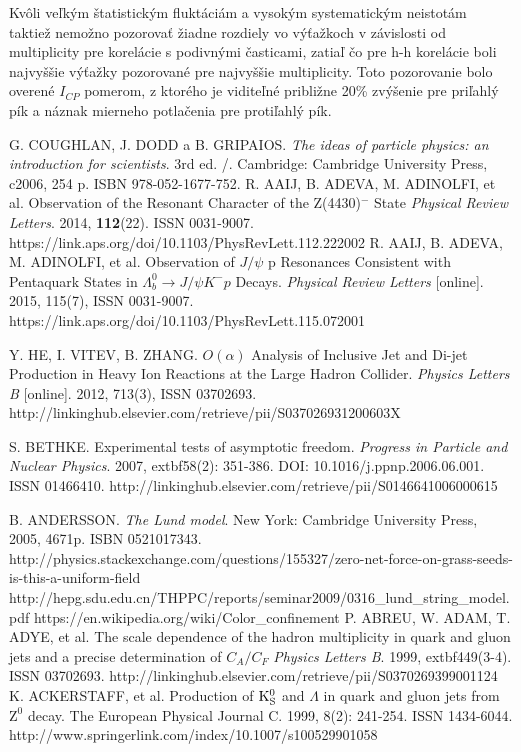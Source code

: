 \documentclass[thesismargins, thesislinespacing]{rnthesis}
\begin{document}
Kvôli veľkým štatistickým fluktáciám a vysokým systematickým neistotám taktiež nemožno pozorovať žiadne rozdiely vo výťažkoch v závislosti od multiplicity pre korelácie s podivnými časticami, zatiaľ čo pre h-h korelácie boli najvyššie výťažky pozorované pre najvyššie multiplicity. Toto pozorovanie bolo overené $I_{CP}$ pomerom, z ktorého je viditeľné približne 20\% zvýšenie pre priľahlý pík a náznak mierneho potlačenia pre protiľahlý pík.  




%


\begin{thebibliography}{}

G. COUGHLAN, J. DODD a B. GRIPAIOS. \textit{The ideas of particle physics: an introduction for scientists}. 3rd ed. /. Cambridge: Cambridge University Press, c2006, 254 p. ISBN 978-052-1677-752.
R. AAIJ, B. ADEVA, M. ADINOLFI, et al. Observation of the Resonant Character of the Z(4430)$^{-}$ State \textit{Physical Review Letters}. 2014, \textbf{112}(22). ISSN 0031-9007. https://link.aps.org/doi/10.1103/PhysRevLett.112.222002
R. AAIJ, B. ADEVA, M. ADINOLFI, et al. Observation of $J / \psi$ p Resonances Consistent with Pentaquark States in $\Lambda_b^0 \rightarrow J / \psi K^{-}p$ Decays. \textit{Physical Review Letters} [online]. 2015, 115(7),  ISSN 0031-9007. https://link.aps.org/doi/10.1103/PhysRevLett.115.072001

Y. HE, I. VITEV, B. ZHANG. 
 $O(\alpha)$ Analysis of Inclusive Jet and Di-jet Production in Heavy Ion Reactions at the Large Hadron Collider. \textit{Physics Letters B} [online]. 2012, 713(3), ISSN 03702693. http://linkinghub.elsevier.com/retrieve/pii/S037026931200603X

S. BETHKE. Experimental tests of asymptotic freedom. \textit{Progress in Particle and Nuclear Physics}. 2007, extbf{58}(2): 351-386. DOI: 10.1016/j.ppnp.2006.06.001. ISSN 01466410.  http://linkinghub.elsevier.com/retrieve/pii/S0146641006000615

B. ANDERSSON. \textit{The Lund model}. New York: Cambridge University Press, 2005, 4671p. ISBN 0521017343.
http://physics.stackexchange.com/questions/155327/zero-net-force-on-grass-seeds-is-this-a-uniform-field
http://hepg.sdu.edu.cn/THPPC/reports/seminar2009/0316\_lund\_string\_model.pdf
https://en.wikipedia.org/wiki/Color\_confinement
P. ABREU, W. ADAM, T. ADYE, et al. The scale dependence of the hadron multiplicity in quark and gluon jets and a precise determination of $C_A/C_F$ \textit{Physics Letters B}. 1999, extbf{449}(3-4). ISSN 03702693.  http://linkinghub.elsevier.com/retrieve/pii/S0370269399001124
K. ACKERSTAFF, et al.  Production of ${\rm K}^0_{\rm S}$ and $\Lambda$ in quark and gluon jets from $\mathrm{Z^0}$ decay. The European Physical Journal C. 1999, 8(2): 241-254. ISSN 1434-6044.
http://www.springerlink.com/index/10.1007/s100529901058


\end{thebibliography}
\end{document}
